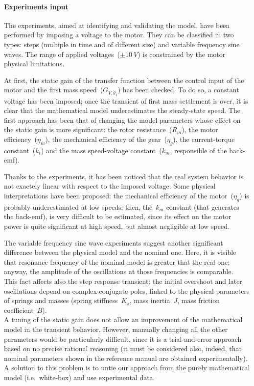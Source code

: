 \paragraph{Experiments input}
The experiments, aimed at identifying and validating the model, have been performed by imposing a voltage to the motor. They can be classified in two types: steps (multiple in time and of different size) and variable frequency sine waves. The range of applied voltages~($\pm 10\ V$) is constrained by the motor physical limitations.

At first, the static gain of the transfer function between the control input of the motor and the first mass speed~($G_{V,\dot{\theta}_1}$) has been checked. To do so, a constant voltage has been imposed; once the transient of first mass settlement is over, it is clear that the mathematical model underestimates the steady-state speed.
The first approach has been that of changing the model parameters whose effect on the static gain is more significant: the rotor resistance~($R_m$), the motor efficiency~($\eta_m$), the mechanical efficiency of the gear~($\eta_g$), the current-torque constant~($k_t$) and the mass speed-voltage constant~($k_m$, responsible of the back-emf).

Thanks to the experiments, it has been noticed that the real system behavior is not exactely linear with respect to the imposed voltage. Some physical interpretations have been proposed: the mechanical efficiency of the motor~($\eta_g$) is probably underestimated at low speeds; then, the~$k_m$ constant (that generates the back-emf), is very difficult to be estimated, since its effect on the motor power is quite significant at high speed, but almost negligible at low speed.


The variable frequency sine wave experiments suggest another significant difference between the physical model and the nominal one. Here, it is visible that resonance frequency of the nominal model is greater that the real one; anyway, the amplitude of the oscillations at those frequencies is comparable. \\
This fact affects also the step response transient: the initial overshoot and later oscillations depend on complex conjugate poles, linked to the physical parameters of springs and masses (spring stiffness~$K_s$, mass inertia~$J$, mass friction coefficient~$B$). \\

A tuning of the static gain does not allow an improvement of the mathematical model in the transient behavior. However, manually changing all the other parameters would be particularly difficult, since it is a trial-and-error approach based on no precise rational reasoning (it must be considered also, indeed, that nominal parameters shown in the reference manual are obtained experimentally).
A solution to this problem is to untie our approach from the purely mathematical model (i.e.\ white-box) and use experimental data.

